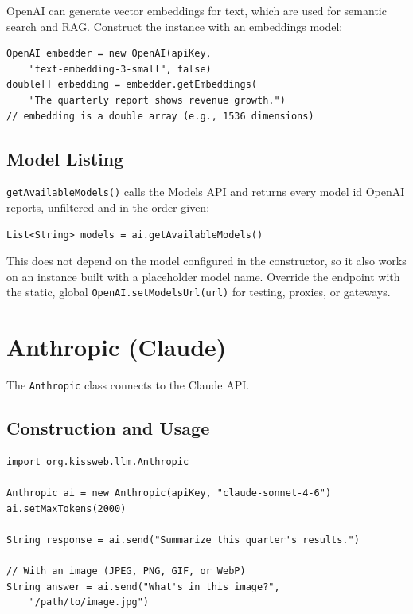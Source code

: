 OpenAI can generate vector embeddings for text, which are used for semantic search and RAG.  Construct the instance with an embeddings model:

\begin{lstlisting}[style=groovy]
OpenAI embedder = new OpenAI(apiKey,
    "text-embedding-3-small", false)
double[] embedding = embedder.getEmbeddings(
    "The quarterly report shows revenue growth.")
// embedding is a double array (e.g., 1536 dimensions)
\end{lstlisting}

\subsection{Model Listing}
\label{sec:llm-openai-models}

\texttt{getAvailableModels()} calls the Models API and returns every model id OpenAI reports, unfiltered and in the order given:

\begin{lstlisting}[style=groovy]
List<String> models = ai.getAvailableModels()
\end{lstlisting}

\noindent
This does not depend on the model configured in the constructor, so it also works on an instance built with a placeholder model name.  Override the endpoint with the static, global \texttt{OpenAI.setModelsUrl(url)} for testing, proxies, or gateways.

\section{Anthropic (Claude)}
\label{sec:llm-anthropic}

The \texttt{Anthropic} class connects to the Claude API.

\subsection{Construction and Usage}

\begin{lstlisting}[style=groovy]
import org.kissweb.llm.Anthropic

Anthropic ai = new Anthropic(apiKey, "claude-sonnet-4-6")
ai.setMaxTokens(2000)

String response = ai.send("Summarize this quarter's results.")

// With an image (JPEG, PNG, GIF, or WebP)
String answer = ai.send("What's in this image?",
    "/path/to/image.jpg")
\end{lstlisting}

